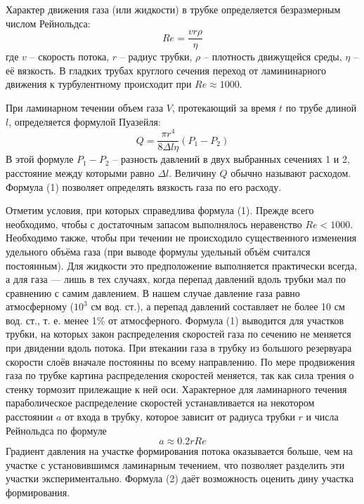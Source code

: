 \documentclass[a4paper,12pt]{article} %
\begin{document}
Характер движения газа (или жидкости) в трубке определяется безразмерным числом Рейнольдса:
\[
	Re = \frac{vr\rho}{\eta}
\]
где $v$ -- скорость потока, $r$ -- радиус трубки, $\rho$ -- плотность движущейся среды, $\eta$ -- её вязкость. В гладких трубах круглого сечения переход от ламининарного движения к турбулентному происходит при $Re \approx 1000$.

При ламинарном течении объем газа $V$, протекающий за время $t$ по трубе длиной $l$, определяется формулой Пуазейля:
\begin{equation}
	Q = \frac{\pi r^4}{8 \Delta l \eta}(P_1 - P_2)
\end{equation}
В этой формуле $P_1 - P_2$ -- разность давлений в двух выбранных сечениях 1 и 2, расстояние между которыми равно $\Delta l$. Величину $Q$ обычно называют расходом. Формула (1) позволяет определять вязкость газа по его расходу.

Отметим условия, при которых справедлива формула (1). Прежде всего необходимо, чтобы с достаточным запасом выполнялось неравенство $Re < 1000$. Необходимо также, чтобы при течении не происходило существенного изменения удельного объёма газа (при выводе формулы удельный объём считался постоянным). Для жидкости это предположение выполняется практически всегда, а для газа --- лишь в тех случаях, когда перепад давлений вдоль трубки мал по сравнению с самим давлением. В нашем случае давление газа равно атмосферному ($10^3$ см вод. ст.), а перепад давлений составляет не более 10 см вод. ст., т. е. менее 1\% от атмосферного. Формула (1) выводится для участков трубки, на которых закон распределения скоростей газа по сечению не меняется при двидении вдоль потока.
При втекании газа в трубку из большого резервуара скорости слоёв вначале постоянны по всему направлению. По мере продвижения газа по трубке картина распределения скоростей меняется, так как сила трения о стенку тормозит прилежащие к ней оси. Характерное для ламинарного течения параболическое распределение скоростей устанавливается на некотором расстоянии $a$ от входа в трубку, которое зависит от радиуса трубки $r$ и числа Рейнольдса по формуле 
\begin{equation}
	a \approx 0.2rRe
\end{equation}
Градиент давления на участке формирования потока оказывается больше, чем на участке с установившимся ламинарным течением, что позволяет разделить эти участки экспериментально. Формула (2) даёт возможность оценить дину участка формирования.
\end{document}
